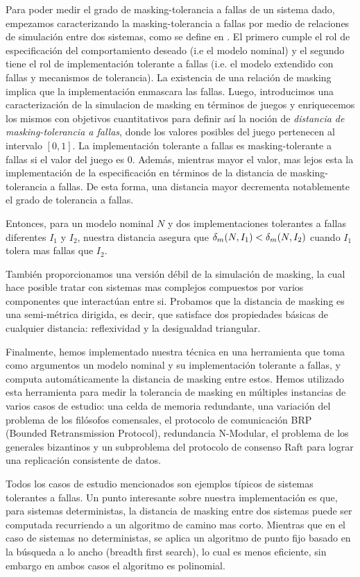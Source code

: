 Para poder medir el grado de masking-tolerancia a fallas de un sistema dado, empezamos caracterizando la masking-tolerancia a fallas por medio de relaciones de simulación entre dos sistemas, como se define en \cite{DemasiCMA17}. El primero cumple el rol de especificación del comportamiento deseado (i.e el modelo nominal) y el segundo tiene el rol de implementación tolerante a fallas (i.e. el modelo extendido con fallas y mecanismos de tolerancia).
La existencia de una relación de masking implica que la implementación enmascara las fallas. Luego, introducimos una caracterización de la simulacion de masking en términos de juegos y enriquecemos los mismos con objetivos cuantitativos para definir así la noción de \emph{distancia de masking-tolerancia a fallas}, donde los valores posibles del juego pertenecen al intervalo  $[0,1]$. La implementación tolerante a fallas es masking-tolerante a fallas si el valor del juego es $0$. Además, mientras mayor el valor, mas lejos esta la implementación de la especificación en términos de la distancia de masking-tolerancia a fallas. De esta forma, una distancia mayor decrementa notablemente el grado de tolerancia a fallas.

Entonces, para un modelo nominal $N$ y dos implementaciones tolerantes a fallas diferentes $I_1$ y $I_2$, nuestra distancia asegura que  $\delta_{m}(N,I_1)<\delta_{m}(N,I_2)$ cuando $I_1$ tolera mas fallas que $I_2$.

También proporcionamos una versión débil de la simulación de masking, la cual hace posible tratar con sistemas mas complejos compuestos por varios componentes que interactúan entre si. Probamos que la distancia de masking es una semi-métrica dirigida, es decir, que satisface dos propiedades básicas de cualquier distancia: reflexividad y la desigualdad triangular.

Finalmente, hemos implementado nuestra técnica en una herramienta que toma como argumentos un modelo nominal y su implementación tolerante a fallas, y computa automáticamente la distancia de masking entre estos.
Hemos utilizado esta herramienta para medir la tolerancia de masking en múltiples instancias de varios casos de estudio: una celda de memoria redundante, una variación del problema de los filósofos comensales, el protocolo de comunicación BRP (Bounded Retransmission Protocol), redundancia N-Modular, el problema de los generales bizantinos y un subproblema del protocolo de consenso Raft para lograr una replicación consistente de datos.

Todos los casos de estudio mencionados son ejemplos típicos de sistemas tolerantes a fallas. Un punto interesante sobre nuestra implementación es que, para sistemas deterministas, la distancia de masking entre dos sistemas puede ser computada recurriendo a un algoritmo de camino mas corto. Mientras que en el caso de sistemas no deterministas, se aplica un algoritmo de punto fijo basado en la búsqueda a lo ancho (breadth first search), lo cual es menos eficiente, sin embargo en ambos casos el algoritmo es polinomial.


